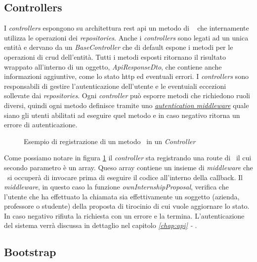 \subsection{Controllers}
\label{server:controllers}
I \textit{controllers} espongono su architettura \acrshort{rest} \acrshort{api} un metodo di \expressjs~ che internamente utilizza le operazioni dei \textit{repositories}. Anche i \textit{controllers} sono legati ad un unica entità e dervano da un \textit{BaseController} che di default espone i metodi per le operazioni di \acrshort{crud} dell'entità. Tutti i metodi esposti ritornano il risultato wrappato all'interno di un oggetto, \textit{ApiResponseDto}, che contiene anche informazioni aggiuntive, come lo stato \acrshort{http} ed eventuali errori.
%
I \textit{controllers} sono responsabili di gestire l'autenticazione dell'utente e le eventuiali eccezioni sollevate dai \textit{repositories}. Ogni \textit{controller} può esporre metodi che richiedono ruoli diversi, quindi ogni metodo definisce tramite uno \textit{\hyperref[server:scopes]{autentication middleware}} quale siano gli utenti abilitati ad eseguire quel metodo e in caso negativo ritorna un errore di autenticazione.

\begin{figure}[H] 
	\centering    
	
	\caption[Esempio di registrazione di un metodo \expressjs~in un \textit{Controller}]{Esempio di registrazione di un metodo \expressjs~in un \textit{Controller}}
	\label{fig:server-controller-1}
\end{figure}

\noindent
Come possiamo notare in figura \ref{fig:server-controller-1} il \textit{controller} sta registrando una route di \expressjs~il cui  secondo parametro è un array. Queso array contiene un insieme di \textit{middleware} che \expressjs~si occuperà di invocare prima di eseguire il codice all'interno della \gls{callback}. Il \textit{middleware}, in questo caso la funzione \textit{ownInternshipProposal}, verifica che l'utente che ha effettuato la chiamata sia effettivamente un soggetto (azienda, professore o studente) della proposta di tirocinio di cui vuole aggiornare lo stato. In caso negativo rifiuta la richiesta con un errore e la termina. L'autenticazione del sistema verrà discussa in dettaglio nel capitolo \textit{\ref{chap:api} - }.

\subsection{Bootstrap}


